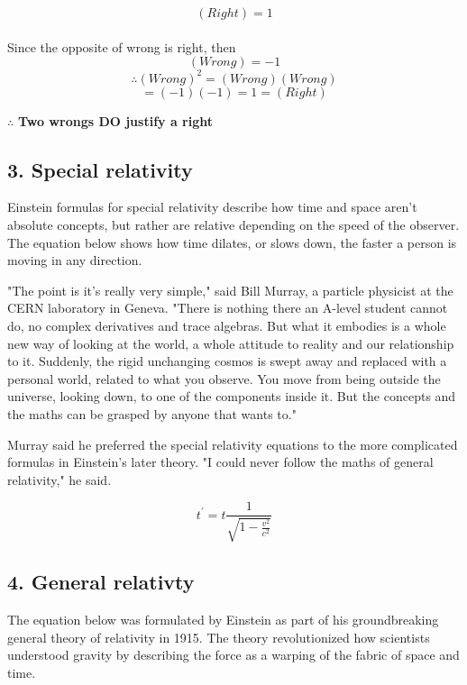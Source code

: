\documentclass[12pt,twocolumn]{article}
\begin{document}
  $$(Right) = 1$$\\
  Since the opposite of wrong is right, then    
  $$(Wrong) = -1$$
  $$ \therefore (Wrong)^2 = (Wrong)(Wrong)$$
  $$  = (-1)(-1)= 1 = (Right)$$
  \begin{center}
   $\therefore$ \textbf{Two wrongs DO justify a right}
  \end{center}
  
\subsection*{3. Special relativity}
\indent \indent  Einstein formulas for special relativity describe how time and space aren't absolute concepts, but rather are relative depending on the speed of the observer. The equation below shows how time dilates, or slows down, the faster a person is moving in any direction.

"The point is it's really very simple," said Bill Murray, a particle physicist at the CERN laboratory in Geneva. "There is nothing there an A-level student cannot do, no complex derivatives and trace algebras. But what it embodies is a whole new way of looking at the world, a whole attitude to reality and our relationship to it. Suddenly, the rigid unchanging cosmos is swept away and replaced with a personal world, related to what you observe. You move from being outside the universe, looking down, to one of the components inside it. But the concepts and the maths can be grasped by anyone that wants to."

Murray said he preferred the special relativity equations to the more complicated formulas in Einstein's later theory. "I could never follow the maths of general relativity," he said.\cite{ClaraM}

	\begin{equation}
	t^\prime = t\frac{1}{\sqrt{1-\frac{v^2}{c^2}}}
	\end{equation}

\subsection*{4. General relativty}
\indent \indent  The equation below was formulated by Einstein as part of his groundbreaking general theory of relativity in 1915. The theory revolutionized how scientists understood gravity by describing the force as a warping of the fabric of space and time.
\end{document}
